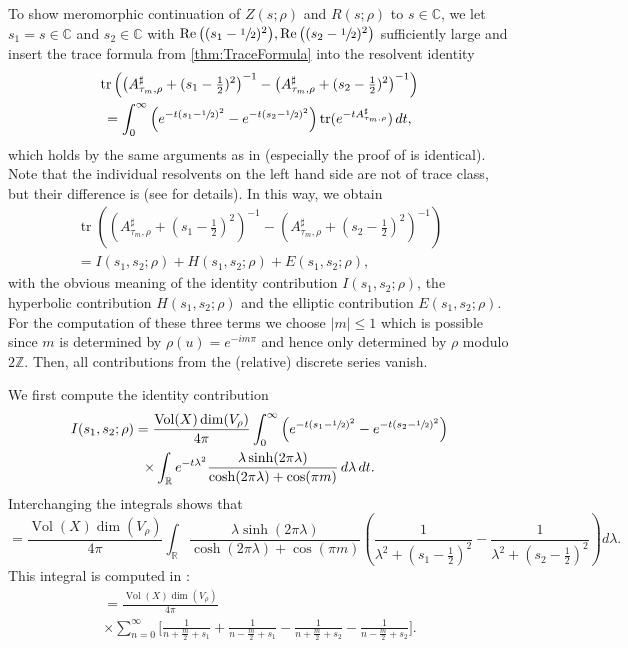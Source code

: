 \documentclass[10pt]{amsart}
\theoremstyle{plain}
\theoremstyle{definition}
\theoremstyle{remark}
\newcommand{\R}{\mathbb{R}}
\newcommand{\Z}{\mathbb{Z}}
\newcommand{\C}{\mathbb{C}}
\DeclareMathOperator{\RE}{Re}
\DeclareMathOperator{\tr}{tr}
\DeclareMathOperator{\Vol}{Vol}
\numberwithin{equation}{section}
\begin{document}
To show meromorphic continuation of $Z(s;\rho)$ and $R(s;\rho)$ to $s\in\C$, we let \hbox{$s_1=s\in\C$} and $s_2\in\C$ with $\RE\big((s_1-\sfrac{1}{2})^2\big),\RE\big((s_2-\sfrac{1}{2})^2\big)$ sufficiently large and insert the trace formula from \cref{thm:TraceFormula} into the resolvent identity
\begin{multline*}
\tr\left(\left(A_{\tau_m,\rho}^\sharp+(s_1-\tfrac{1}{2})^2\right)^{-1}-\left(A_{\tau_m,\rho}^\sharp+(s_2-\tfrac{1}{2})^2\right)^{-1}\right)\\
= \int_0^\infty \left(e^{-t(s_1-\sfrac{1}{2})^2}-e^{-t(s_2-\sfrac{1}{2})^2}\right)\tr(e^{-tA_{\tau_m,\rho}^\sharp})\,dt,
\end{multline*}
which holds by the same arguments as in \cite[\S 4.2]{FS} (especially the proof of \cite[Lem.\,4.2.2]{FS} is identical). Note that the individual resolvents on the left hand side are not of trace class, but their difference is (see \cite[p.\,51]{FS} for details). In this way, we obtain
\begin{multline}
\tr\left(\left(A_{\tau_m,\rho}^\sharp+(s_1-\tfrac{1}{2})^2\right)^{-1}-\left(A_{\tau_m,\rho}^\sharp+(s_2-\tfrac{1}{2})^2\right)^{-1}\right)\\
= I(s_1,s_2;\rho)+H(s_1,s_2;\rho)+E(s_1,s_2;\rho)\label{eq:ResolventIdentityWithIdHypEllContributions},
\end{multline}
with the obvious meaning of the identity contribution $I(s_1,s_2;\rho)$, the hyperbolic contribution $H(s_1,s_2;\rho)$ and the elliptic contribution $E(s_1,s_2;\rho)$. For the computation of these three terms we choose $|m|\leq1$ which is possible since $m$ is determined by $\rho(u)=e^{-im\pi}$ and hence only determined by $\rho$ modulo $2\Z$. Then, all contributions from the (relative) discrete series vanish.

We first compute the identity contribution\vspace*{-3pt}
\begin{multline}
I(s_1,s_2;\rho) = \frac{\Vol(X)\dim(V_\rho)}{4\pi}\int_0^\infty\left(e^{-t(s_1-\sfrac{1}{2})^2}-e^{-t(s_2-\sfrac{1}{2})^2}\right)\\
\times\int_\R e^{-t\lambda^2}\frac{\lambda\sinh(2\pi\lambda)}{\cosh(2\pi\lambda)+\cos(\pi m)}\,d\lambda\,dt.
\end{multline}
Interchanging the integrals shows that\vspace*{-3pt}
\begin{equation*}
= \frac{\Vol(X)\dim(V_\rho)}{4\pi}\!\int_\R\!\frac{\lambda\sinh(2\pi\lambda)}{\cosh(2\pi\lambda)+\cos(\pi m)}\left(\frac{1}{\lambda^2+(s_1-\tfrac{1}{2})^2}-\frac{1}{\lambda^2+(s_2-\tfrac{1}{2})^2}\right)d\lambda.
\end{equation*}
This integral is computed in \cite[Ch.\,10, Lem.\,2.4]{He2}:
\begin{multline}
= \frac{\Vol(X)\dim(V_\rho)}{4\pi}\\[-5pt]
\times\sum_{n=0}^\infty\bigg[\frac{1}{n+\frac{m}{2}+s_1}+\frac{1}{n-\frac{m}{2}+s_1}-\frac{1}{n+\frac{m}{2}+s_2}-\frac{1}{n-\frac{m}{2}+s_2}\bigg]\label{eq:IdentityFinal}.
\end{multline}
\end{document}
